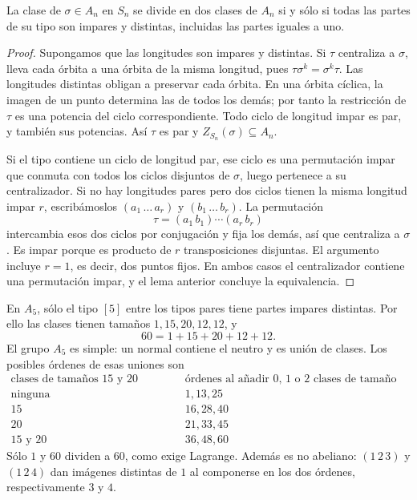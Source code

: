 \begin{prop}\label{prop:C9-division}
La clase de $\sigma\in A_n$ en $S_n$ se divide en dos clases de $A_n$ si y sólo si todas las partes de su tipo son impares y distintas, incluidas las partes iguales a uno.
\end{prop}
\begin{proof}
Supongamos que las longitudes son impares y distintas. Si $\tau$ centraliza a $\sigma$, lleva cada órbita a una órbita de la misma longitud, pues $\tau\sigma^k=\sigma^k\tau$. Las longitudes distintas obligan a preservar cada órbita. En una órbita cíclica, la imagen de un punto determina las de todos los demás; por tanto la restricción de $\tau$ es una potencia del ciclo correspondiente. Todo ciclo de longitud impar es par, y también sus potencias. Así $\tau$ es par y $Z_{S_n}(\sigma)\subseteq A_n$.

Si el tipo contiene un ciclo de longitud par, ese ciclo es una permutación impar que conmuta con todos los ciclos disjuntos de $\sigma$, luego pertenece a su centralizador. Si no hay longitudes pares pero dos ciclos tienen la misma longitud impar $r$, escribámoslos $(a_1\,\ldots\,a_r)$ y $(b_1\,\ldots\,b_r)$. La permutación
\[
\tau=(a_1\,b_1)\cdots(a_r\,b_r)
\]
intercambia esos dos ciclos por conjugación y fija los demás, así que centraliza a $\sigma$. Es impar porque es producto de $r$ transposiciones disjuntas. El argumento incluye $r=1$, es decir, dos puntos fijos. En ambos casos el centralizador contiene una permutación impar, y el lema anterior concluye la equivalencia.
\end{proof}

\begin{ejem}
En $A_5$, sólo el tipo $[5]$ entre los tipos pares tiene partes impares distintas. Por ello las clases tienen tamaños $1,15,20,12,12$, y
\[
60=1+15+20+12+12.
\]
El grupo $A_5$ es simple: un normal contiene el neutro y es unión de clases. Los posibles órdenes de esas uniones son
\[
\begin{array}{c|l}
\text{clases de tamaños 15 y 20 elegidas}&\text{órdenes al añadir 0, 1 o 2 clases de tamaño 12}\\\hline
\text{ninguna}&1,13,25\\
15&16,28,40\\
20&21,33,45\\
15\text{ y }20&36,48,60
\end{array}
\]
Sólo $1$ y $60$ dividen a $60$, como exige Lagrange. Además es no abeliano: $(1\,2\,3)$ y $(1\,2\,4)$ dan imágenes distintas de $1$ al componerse en los dos órdenes, respectivamente $3$ y $4$.
\end{ejem}

